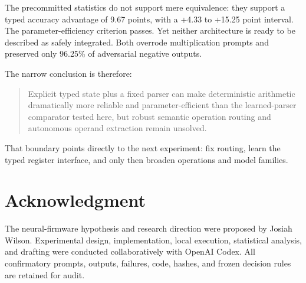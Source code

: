 \documentclass[11pt]{article}
\begin{document}
The precommitted statistics do not support mere equivalence: they support a
typed accuracy advantage of 9.67 points, with a +4.33 to +15.25 point
interval. The parameter-efficiency criterion passes. Yet neither architecture
is ready to be described as safely integrated. Both overrode multiplication
prompts and preserved only 96.25\% of adversarial negative outputs.

The narrow conclusion is therefore:
\begin{quote}
Explicit typed state plus a fixed parser can make deterministic arithmetic
dramatically more reliable and parameter-efficient than the learned-parser
comparator tested here, but robust semantic operation routing and autonomous
operand extraction remain unsolved.
\end{quote}
That boundary points directly to the next experiment: fix routing, learn the
typed register interface, and only then broaden operations and model families.

\section*{Acknowledgment}

The neural-firmware hypothesis and research direction were proposed by Josiah
Wilson. Experimental design, implementation, local execution, statistical
analysis, and drafting were conducted collaboratively with OpenAI Codex. All
confirmatory prompts, outputs, failures, code, hashes, and frozen decision
rules are retained for audit.
\end{document}
